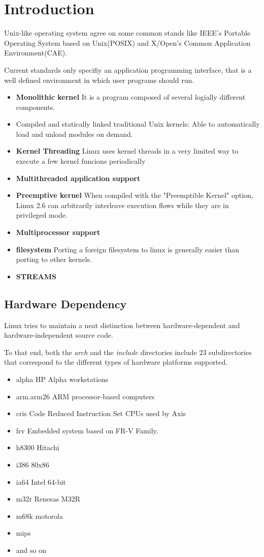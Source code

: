 \documentclass[a4paper,10pt]{book}
\begin{document}
\chapter{Introduction}
Unix-like operating system agree on some common stands like IEEE's Portable
Operating System based on Unix(POSIX) and X/Open's Common Application
Environment(CAE).

Current standards only specifiy an application programming interface, that is a
well defined environment in which user programs should run.
\begin{itemize}
\item \textbf{Monolithic kernel} It is a program composed of several logially
different components.
\item Compiled and statically linked traditional Unix kernels: Able to
automatically load and unload modules on demand.
\item \textbf{Kernel Threading} Linux uses kernel threads in a very limited way
to execute a few kernel funcions periodically
\item \textbf{Multithreaded application support}
\item \textbf{Preemptive kernel} When compiled with the "Preemptible Kernel"
option, Linux 2.6 can arbitrarily interleave execution flows while they are in
privileged mode.
\item \textbf{Multiprocessor support}
\item \textbf{filesystem} Porting a foreign filesystem to linux is generally
easier than porting to other kernels.
\item \textbf{STREAMS}
\end{itemize}
\section{Hardware Dependency}
Linux tries to maintain a neat distinction between hardware-dependent and
hardware-independent source code. 

To that end, both the \emph{arch} and the \emph{include} directories include 23
subdirectories that correspond to the different types of hardware platforms
supported.

\begin{itemize}
\item alpha HP Alpha workstations
\item arm.arm26 ARM processor-based computers
\item cris Code Reduced Instruction Set CPUs used by Axis
\item frv Embedded system based on FR-V Family.
\item h8300 Hitachi
\item i386 80x86
\item ia64 Intel 64-bit
\item m32r Renesas M32R
\item m68k motorola
\item mips
\item and so on
\end{itemize}
\end{document}
